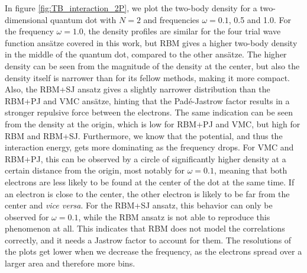 In figure \eqref{fig:TB_interaction_2P}, we plot the two-body density for a two-dimensional quantum dot with $N=2$ and frequencies $\omega=0.1$, 0.5 and 1.0. For the frequency $\omega=1.0$, the density profiles are similar for the four trial wave function ansätze covered in this work, but RBM gives a higher two-body density in the middle of the quantum dot, compared to the other ansätze. The higher density can be seen from the magnitude of the density at the center, but also the density itself is narrower than for its fellow methods, making it more compact. Also, the RBM+SJ ansatz gives a slightly narrower distribution than the RBM+PJ and VMC ansätze, hinting that the Padé-Jastrow factor results in a stronger repulsive force between the electrons. The same indication can be seen from the density at the origin, which is low for RBM+PJ and VMC, but high for RBM and RBM+SJ. Furthermore, we know that the potential, and thus the interaction energy, gets more dominating as the frequency drops. For VMC and RBM+PJ, this can be observed by a circle of significantly higher density at a certain distance from the origin, most notably for $\omega=0.1$, meaning that both electrons are less likely to be found at the center of the dot at the same time. If an electron is close to the center, the other electron is likely to be far from the center and \textit{vice versa}. For the RBM+SJ ansatz, this behavior can only be observed for $\omega=0.1$, while the RBM ansatz is not able to reproduce this phenomenon at all. This indicates that RBM does not model the correlations correctly, and it needs a Jastrow factor to account for them. The resolutions of the plots get lower when we decrease the frequency, as the electrons spread over a larger area and therefore more bins.

